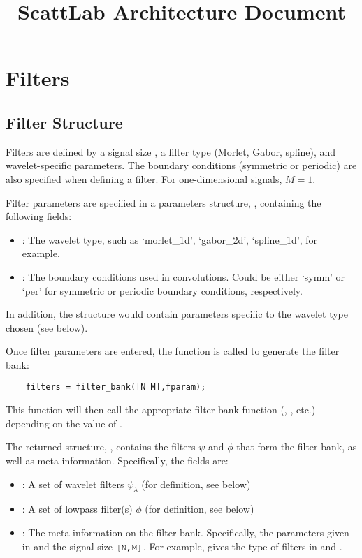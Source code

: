 \documentclass[twocolumn]{article}
\title{ScattLab Architecture Document}
\begin{document}
	
\maketitle

\section{Filters}

\subsection{Filter Structure}

Filters are defined by a signal size \mcode{[N,M]}, a filter type (Morlet, Gabor, spline), and wavelet-specific parameters. The boundary conditions (symmetric or periodic) are also specified when defining a filter. For one-dimensional signals, $M = 1$.

Filter parameters are specified in a parameters structure, , containing the following fields:
\begin{itemize}
	\item {}: The wavelet type, such as `morlet\_1d', `gabor\_2d', `spline\_1d', for example.
	\item {}: The boundary conditions used in convolutions. Could be either `symm' or `per' for symmetric or periodic boundary conditions, respectively.
\end{itemize}
In addition, the  structure would contain parameters specific to the wavelet type chosen (see below).

Once filter parameters are entered, the  function is called
to generate the filter bank:
\begin{lstlisting}
	filters = filter_bank([N M],fparam);
\end{lstlisting}
This function will then call the appropriate filter bank function (, , etc.) depending on the value of .

The returned structure, , contains the filters $\psi$ and $\phi$ that form the filter bank, as well as meta information. Specifically, the fields are:
\begin{itemize}
	\item {}: A set of wavelet filters $\psi_\lambda$ (for definition, see below)
	\item {}: A set of lowpass filter(s) $\phi$ (for definition, see below)
	\item {}: The meta information on the filter bank. Specifically, the parameters given in  and the signal size $\mcode{[N,M]}$. For example,  gives the type of filters in  and .
\end{itemize}
\end{document}
